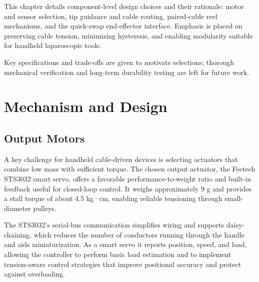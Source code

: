 



\ChapterSummary
This chapter details component-level design choices and their rationale: motor and sensor selection, tip guidance and cable routing, paired-cable reel mechanisms, and the quick-swap end-effector interface. Emphasis is placed on preserving cable tension, minimizing hysteresis, and enabling modularity suitable for handheld laparoscopic tools.

\noindent
Key specifications and trade-offs are given to motivate selections; thorough mechanical verification and long-term durability testing are left for future work.

\section{Mechanism and Design}
\subsection{Output Motors}
A key challenge for handheld cable-driven devices is selecting actuators that combine low mass with sufficient torque. The chosen output actuator, the Feetech STS3032 smart servo, offers a favorable performance-to-weight ratio and built-in feedback useful for closed-loop control. It weighs approximately 9 g and provides a stall torque of about 4.5 kg·cm, enabling reliable tensioning through small-diameter pulleys.

The STS3032's serial-bus communication simplifies wiring and supports daisy-chaining, which reduces the number of conductors running through the handle and aids miniaturization. As a smart servo it reports position, speed, and load, allowing the controller to perform basic load estimation and to implement tension-aware control strategies that improve positional accuracy and protect against overloading.

